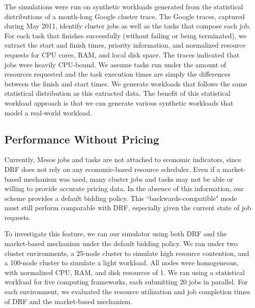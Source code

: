 \documentclass{acm_proc_article-sp}
\begin{document}
The simulations were run on synthetic workloads generated from the statistical distributions of a month-long Google cluster trace. The Google traces, captured during May 2011, identify cluster jobs as well as the tasks that compose each job. For each task that finishes successfully (without failing or being terminated), we extract the start and finish times, priority information, and normalized resource requests for CPU cores, RAM, and local disk space. The traces indicated that jobs were heavily CPU-bound. We assume tasks run under the amount of resources requested and the task execution times are simply the differences between the finish and start times. We generate workloads that follows the same statistical distribution as this extracted data. The benefit of this statistical workload approach is that we can generate various synthetic workloads that model a real-world workload.

\subsection{Performance Without Pricing\\}

Currently, Mesos jobs and tasks are not attached to economic indicators, since DRF does not rely on any economic-based resource scheduler. Even if a market-based mechanism was used, many cluster jobs and tasks may not be able or willing to provide accurate pricing data. In the absence of this information, our scheme provides a default bidding policy. This ``backwards-compatible" mode must still perform comparable with DRF, especially given the current state of job requests.

To investigate this feature, we ran our simulator using both DRF and the market-based mechanism under the default bidding policy. We ran under two cluster environments, a 25-node cluster to simulate high resource contention, and a 100-node cluster to simulate a light workload. All nodes were homogeneous, with normalized CPU, RAM, and disk resources of 1. We ran using a statistical workload for five computing frameworks, each submitting 20 jobs in parallel. For each environment, we evaluated the resource utilization and job completion times of DRF and the market-based mechanism.
\end{document}
